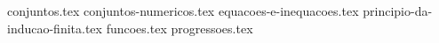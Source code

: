 \documentclass[a4paper,12pt, oneside]{book}
\begin{document}
    \nocite{*}
    \thispagestyle{empty}       %

    \printtitle                 %
        \vfill
    \printauthor                %
    \newpage
    
    \frontmatter %
    \tableofcontents
    \mainmatter %
    
    {
        \newcommand{\templatesdir}{src/esqueletos-dos-capitulos/}

        {conjuntos.tex}
        {conjuntos-numericos.tex}
        {equacoes-e-inequacoes.tex}
        {principio-da-inducao-finita.tex}
        {funcoes.tex}
        {progressoes.tex}
    }
\end{document}
